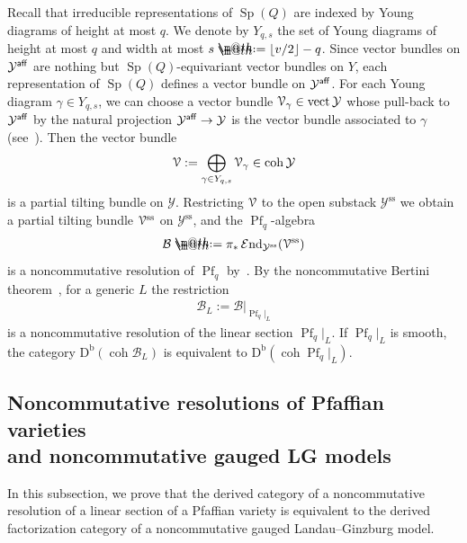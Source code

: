 \documentclass[pdftex]{sigma}%
\makeatletter
\newcommand*{\defeq}{\mathrel{\rlap{%
 \raisebox{0.3ex}{$\m@th\cdot$}}%
 \raisebox{-0.3ex}{$\m@th\cdot$}}%
 =}
\numberwithin{equation}{section}
\newcommand{\cEnd}{\operatorname{{\mathcal E}nd}}
\newcommand{\coh}{\operatorname{coh}}
\newcommand{\vect}{\operatorname{vect}}
\newcommand{\Db}{\operatorname{D^b}}
\newcommand{\Pf}{\operatorname{Pf}}
\newcommand{\Sp}{\operatorname{Sp}}
\newcommand{\aff}{\operatorname{\sf aff}}
\newcommand{\stab}{\operatorname{ss}}
\newcommand{\cB}{\mathcal{B}}
\newcommand{\cY}{\mathcal{Y}}
\newcommand{\scrV}{\EuScript{V}}
\newcommand{\rest}{\!|_L}
\makeatother
\begin{document}
Recall that irreducible representations of $\Sp(Q)$ are indexed by Young diagrams of height at most $q$. We denote by $Y_{q,s}$ the set of Young diagrams of height at most $q$ and width at most $s\defeq\lfloor v/2\rfloor-q$. Since vector bundles on $\cY^{\aff}$ are nothing but $\Sp(Q)$-equivariant vector bundles on $Y$, each representation of $\Sp(Q)$ defines a vector bundle
 on $\cY^{\aff}$. For each Young diagram $\gamma\in Y_{q,s}$, we can choose a vector bundle $\scrV_{\gamma}\in \vect\cY$ whose pull-back to $\cY^{\aff}$ by the natural projection $\cY^{\aff}\to \cY$ is the vector bundle associated to $\gamma$ (see~\cite[Section~2.4]{rs}). Then the vector bundle
\begin{gather*}
\scrV:=\bigoplus_{\gamma\in Y_{q,s}}\scrV_{\gamma}\in \coh\cY
\end{gather*}
is a partial tilting bundle on $\cY$. Restricting $\scrV$ to the open substack $\cY^{\stab}$ we obtain a partial tilting bundle
$\scrV^{\stab}$ on $\cY^{\stab}$, and the ${\Pf_q}$-algebra
\begin{gather*}
\cB\defeq\pi_*\cEnd_{\cY^{\stab}}(\scrV^{\stab})
\end{gather*}
is a noncommutative resolution of $\Pf_q$ by~\cite[Section~5]{svdb}.
By the noncommutative Bertini theorem~\cite{rsv}, for a generic $L$ the restriction
\begin{gather*}
\cB_L:=\cB|_{\Pf_q\rest}
\end{gather*}
 is a noncommutative resolution of the linear section $\Pf_q\rest$. If $\Pf_q\rest$ is smooth, the category $\Db (\coh \cB_L )$ is equivalent to $\Db (\coh \Pf_q\rest )$.

 \subsection[Noncommutative resolutions of Pfaffian varieties and noncommutative gauged LG models]
 {Noncommutative resolutions of Pfaffian varieties \\and noncommutative gauged LG models}

 In this subsection, we prove that the derived category of a noncommutative resolution of a linear section of a Pfaffian variety is equivalent to the derived factorization category of a noncommutative gauged Landau--Ginzburg model.
\end{document}
